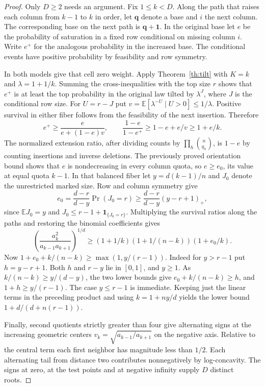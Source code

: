 \documentclass[11pt]{article}
\newcommand{\one}{\mathbf 1}
\newcommand{\q}{\boldsymbol q}
\begin{document}
\begin{proof}
Only $D\ge2$ needs an argument. Fix $1\le k<D$. Along the path that raises each column from $k-1$ to $k$ in order, let $\q$ denote a base and $i$ the next column. The corresponding base on the next path is $\q+\one$. In the original base let $e$ be the probability of saturation in a fixed row conditional on missing column $i$. Write $e^+$ for the analogous probability in the increased base. The conditional events have positive probability by feasibility and row symmetry.

In both models give that cell zero weight. Apply Theorem~\ref{th:tilt} with $K=k$ and $\lambda=1+1/k$. Summing the cross-inequalities with the top size $r$ shows that $e^+$ is at least the top probability in the original law tilted by $\lambda^J$, where $J$ is the conditional row size. For $U=r-J$ put $v=\mathbb E[\lambda^{-U}\mid U>0]\le1/\lambda$. Positive survival in either fiber follows from the feasibility of the next insertion. Therefore
\[
 e^+\ge\frac{e}{e+(1-e)v},\qquad
 \frac{1-e}{1-e^+}\ge 1-e+e/v\ge1+e/k .
\]
The normalized extension ratio, after dividing counts by $\prod_h\binom n{q_h}$, is $1-e$ by counting insertions and inverse deletions. The previously proved orientation bound \cite{orient} shows that $e$ is nondecreasing in every column quota, so $e\ge e_0$, its value at equal quota $k-1$. In that balanced fiber let $y=d(k-1)/n$ and $J_0$ denote the unrestricted marked size. Row and column symmetry give
\[
 e_0=\frac{d-r}{d-y}\Pr(J_0=r)\ge \frac{d-r}{d-y}(y-r+1)_+ ,
\]
since $\mathbb EJ_0=y$ and $J_0\le r-1+\one_{\{J_0=r\}}$. Multiplying the survival ratios along the paths and restoring the binomial coefficients gives
\[
 \left(\frac{a_k^2}{a_{k-1}a_{k+1}}\right)^{1/d}
 \ge (1+1/k)(1+1/(n-k))(1+e_0/k).
\]
Now $1+e_0+k/(n-k)\ge\max(1,y/(r-1))$. Indeed for $y>r-1$ put $h=y-r+1$. Both $h$ and $r-y$ lie in $[0,1]$, and $y\ge1$. As $k/(n-k)\ge y/(d-y)$, the two lower bounds give $e_0+k/(n-k)\ge h$, and $1+h\ge y/(r-1)$. The case $y\le r-1$ is immediate. Keeping just the linear terms in the preceding product and using $k=1+ny/d$ yields the lower bound $1+d/(d+n(r-1))$.

Finally, second quotients strictly greater than four give alternating signs at the increasing geometric centers $v_k=\sqrt{a_{k-1}/a_{k+1}}$ on the negative axis. Relative to the central term each first neighbor has magnitude less than $1/2$. Each alternating tail from distance two contributes nonnegatively by log-concavity. The signs at zero, at the test points and at negative infinity supply $D$ distinct roots.
\end{proof}
\end{document}
